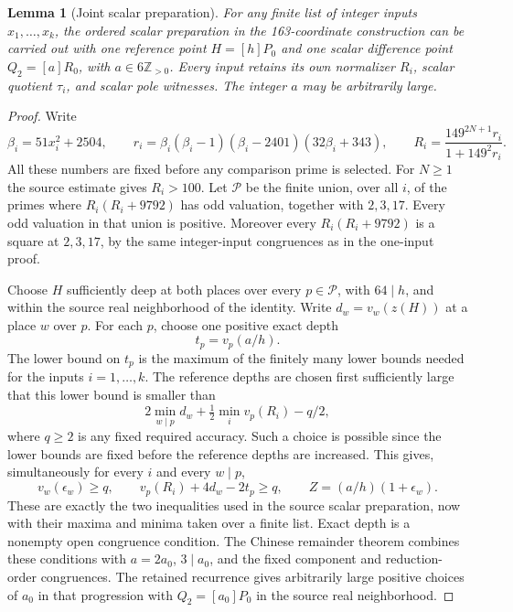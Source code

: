 \documentclass[11pt]{article}
\newtheorem{lemma}[theorem]{Lemma}
\begin{document}
\begin{lemma}[Joint scalar preparation]
\label{lem:joint-scalar-preparation}
For any finite list of integer inputs $x_1,\ldots,x_k$, the ordered
scalar preparation in the 163-coordinate construction can be carried
out with one reference point $H=[h]P_0$ and one scalar difference
point $Q_2=[a]R_0$, with $a\in6\mathbb Z_{>0}$.  Every input retains
its own normalizer $R_i$, scalar quotient $\tau_i$, and scalar pole
witnesses.  The integer $a$ may be arbitrarily large.
\end{lemma}
\begin{proof}
Write
\[
 \beta_i=51x_i^2+2504,\qquad
 r_i=\beta_i(\beta_i-1)(\beta_i-2401)(32\beta_i+343),\qquad
 R_i=\frac{149^{2N+1}r_i}{1+149^2r_i}.
\]
All these numbers are fixed before any comparison prime is selected.
For $N\ge1$ the source estimate gives $R_i>100$.
Let $\mathcal P$ be the finite union, over all $i$, of the primes
where $R_i(R_i+9792)$ has odd valuation, together with $2,3,17$.
Every odd valuation in that union is positive.  Moreover every
$R_i(R_i+9792)$ is a square at $2,3,17$, by the same integer-input
congruences as in the one-input proof.

Choose $H$ sufficiently deep at both places over every $p\in\mathcal
P$, with $64\mid h$, and within the source real neighborhood of the
identity.  Write $d_w=v_w(z(H))$ at a place $w$ over $p$.  For each
$p$, choose one positive exact depth
\[
                         t_p=v_p(a/h).
\]
The lower bound on $t_p$ is the maximum of the finitely many lower
bounds needed for the inputs $i=1,\ldots,k$.  The reference depths
are chosen first sufficiently large that this lower bound is smaller
than
\[
             2\min_{w\mid p} d_w+
             \tfrac12\min_i v_p(R_i)-q/2,
\]
where $q\ge2$ is any fixed required accuracy.  Such a choice is
possible since the lower bounds are fixed before the reference depths
are increased.  This gives, simultaneously for every $i$ and every
$w\mid p$,
\[
 v_w(\epsilon_w)\ge q,\qquad
 v_p(R_i)+4d_w-2t_p\ge q,
 \qquad Z=(a/h)(1+\epsilon_w).
\]
These are exactly the two inequalities used in the source scalar
preparation, now with their maxima and minima taken over a finite
list.  Exact depth is a nonempty open congruence condition.  The
Chinese remainder theorem combines these conditions with $a=2a_0$,
$3\mid a_0$, and the fixed component and reduction-order congruences.
The retained recurrence gives arbitrarily large positive choices of
$a_0$ in that progression with $Q_2=[a_0]P_0$ in the source real
neighborhood.


\end{proof}
\end{document}
